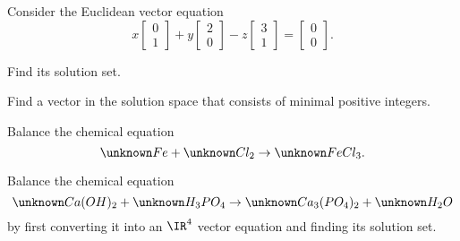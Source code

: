 \begin{applicationActivities}
\begin{activity}{10}
  Consider the Euclidean vector equation
  \[
    x\begin{bmatrix}0\\1\end{bmatrix}
      +
    y\begin{bmatrix}2\\0\end{bmatrix}
      -
    z\begin{bmatrix}3\\1\end{bmatrix}
      =
    \begin{bmatrix}0\\0\end{bmatrix}
  .\]
  \begin{subactivity}
    Find its solution set.
  \end{subactivity}
  \begin{subactivity}
    Find a vector in the solution space that consists of minimal
    positive integers.
  \end{subactivity}
  \begin{subactivity}
    Balance the chemical equation
    \[
      \unknown Fe + \unknown Cl_2
        \rightarrow
      \unknown FeCl_3
    .\]
  \end{subactivity}
\end{activity}

\begin{activity}{10}
  Balance the chemical equation
  \[
    \unknown Ca(OH)_2 + \unknown H_3PO_4
      \rightarrow
    \unknown Ca_3(PO_4)_2 + \unknown H_2O
  \]
  by first converting it into an \(\IR^4\) vector equation
  and finding its solution set.
\end{activity}

\end{applicationActivities}
